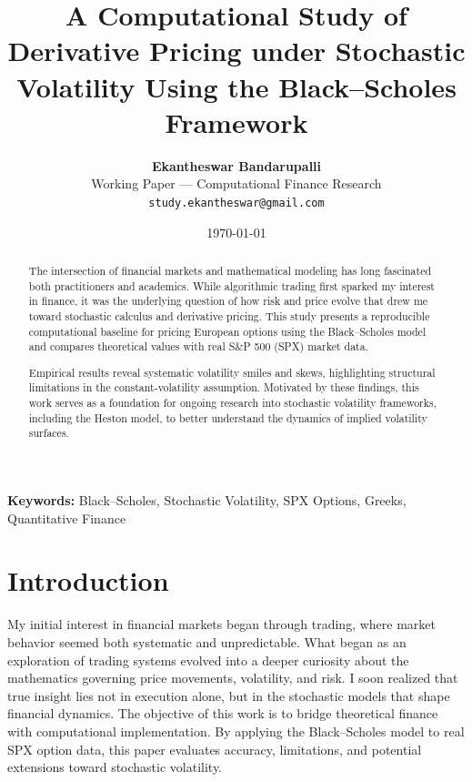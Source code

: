 \documentclass[12pt]{article}
\title{\textbf{A Computational Study of Derivative Pricing under Stochastic Volatility Using the Black--Scholes Framework}}
\author{\textbf{Ekantheswar Bandarupalli}\\
\small Working Paper --- Computational Finance Research\\
\small \texttt{study.ekantheswar@gmail.com}}
\date{\today}
\begin{document}
\maketitle

\thispagestyle{empty}

\begin{abstract}
The intersection of financial markets and mathematical modeling has long fascinated both practitioners and academics. While algorithmic trading first sparked my interest in finance, it was the underlying question of how risk and price evolve that drew me toward stochastic calculus and derivative pricing. This study presents a reproducible computational baseline for pricing European options using the Black--Scholes model and compares theoretical values with real S\&P 500 (SPX) market data. 

Empirical results reveal systematic volatility smiles and skews, highlighting structural limitations in the constant-volatility assumption. Motivated by these findings, this work serves as a foundation for ongoing research into stochastic volatility frameworks, including the Heston model, to better understand the dynamics of implied volatility surfaces.
\end{abstract}


\textbf{Keywords:} Black--Scholes, Stochastic Volatility, SPX Options, Greeks, Quantitative Finance


\newpage
\setcounter{page}{1}

\section{Introduction}
My initial interest in financial markets began through trading, where market behavior seemed both systematic and unpredictable.
What began as an exploration of trading systems evolved into a deeper curiosity about the mathematics governing price movements,
volatility, and risk. I soon realized that true insight lies not in execution alone, but in the stochastic models that shape
financial dynamics. The objective of this work is to bridge theoretical finance with computational implementation.
By applying the Black--Scholes model to real SPX option data, this paper evaluates accuracy, limitations, and potential extensions
toward stochastic volatility.

\end{document}
